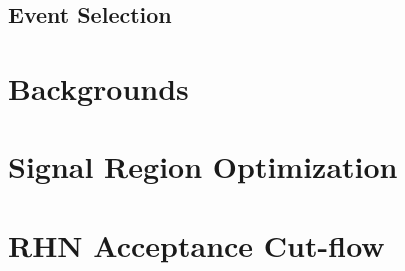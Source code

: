 \documentclass[letterpaper,12pt]{article}
\begin{document}
\subsection{Event Selection}
\label{sec:eventsel}

\section{Backgrounds}
\label{sec:backgrounds}

\section{Signal Region Optimization}
\label{sec:sro}

\section{RHN Acceptance Cut-flow}
\label{sec:cutflow}
\end{document}
